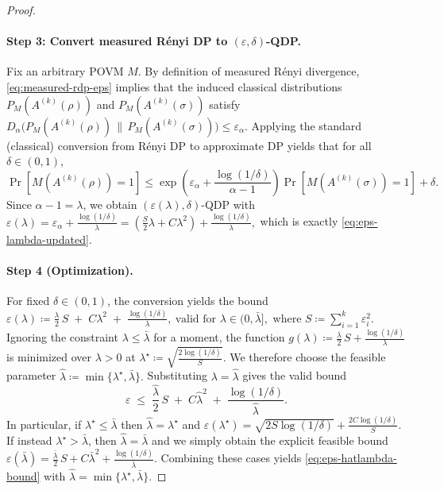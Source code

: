 \documentclass[11pt]{article}
\theoremstyle{plain}
\theoremstyle{remark}
\begin{document}
\begin{proof}
\paragraph{Step 3: Convert measured R\'enyi DP to $(\varepsilon,\delta)$-QDP.}
Fix an arbitrary POVM $M$. By definition of measured R\'enyi divergence,
\eqref{eq:measured-rdp-eps} implies that the induced classical distributions
$P_M(A^{(k)}(\rho))$ and $P_M(A^{(k)}(\sigma))$ satisfy
$
D_{\alpha}\!\big(P_M(A^{(k)}(\rho))\,\|\,P_M(A^{(k)}(\sigma))\big)
\le
\varepsilon_\alpha.
$
Applying the standard (classical) conversion from R\'enyi DP to approximate DP yields that for all
$\delta\in(0,1)$,
\[
\Pr[M(A^{(k)}(\rho))=1]
\le
\exp\!\left(\varepsilon_\alpha+\frac{\log(1/\delta)}{\alpha-1}\right)
\Pr[M(A^{(k)}(\sigma))=1]+\delta.
\]
Since $\alpha-1=\lambda$, we obtain $(\varepsilon(\lambda),\delta)$-QDP with
$
\varepsilon(\lambda)
=
\varepsilon_\alpha + \frac{\log(1/\delta)}{\lambda}
=
\left(\frac{S}{2}\lambda + C\lambda^2\right) + \frac{\log(1/\delta)}{\lambda},
$
which is exactly \eqref{eq:eps-lambda-updated}.


\paragraph{Step 4 (Optimization).}
For fixed $\delta\in(0,1)$, the conversion 
yields the bound
$
\varepsilon(\lambda)
\coloneqq \frac{\lambda}{2}\,S \;+\; C\lambda^2 \;+\; \frac{\log(1/\delta)}{\lambda},
\ \text{valid for } \lambda\in(0,\bar\lambda],
$
where $S\coloneqq\sum_{i=1}^k \varepsilon_i^2$.
Ignoring the constraint $\lambda\le \bar\lambda$ for a moment, the function
$
g(\lambda)\coloneqq\frac{\lambda}{2}\,S+\frac{\log(1/\delta)}{\lambda}
$
is minimized over $\lambda>0$ at
$
\lambda^\star \coloneqq \sqrt{\frac{2\log(1/\delta)}{S}}.
$
We therefore choose the feasible parameter
$
\hat\lambda \coloneqq \min\{\lambda^\star,\bar\lambda\}.
$
Substituting $\lambda=\hat\lambda$ gives the valid bound
\begin{equation}
\label{eq:eps-hatlambda-bound}
\varepsilon
\;\le\;
\frac{\hat\lambda}{2}\,S \;+\; C\hat\lambda^2 \;+\; \frac{\log(1/\delta)}{\hat\lambda}.
\end{equation}
In particular, if $\lambda^\star\le \bar\lambda$ then $\hat\lambda=\lambda^\star$ and
$
\varepsilon(\lambda^\star)
=
\sqrt{2S\log(1/\delta)}+\frac{2C\log(1/\delta)}{S}.
$
If instead $\lambda^\star>\bar\lambda$, then $\hat\lambda=\bar\lambda$ and we simply obtain the explicit feasible bound \\ 
$
\varepsilon(\bar\lambda)
=
\frac{\bar\lambda}{2}\,S + C\bar\lambda^2 + \frac{\log(1/\delta)}{\bar\lambda}.$
Combining these cases yields \eqref{eq:eps-hatlambda-bound} with
$\hat\lambda=\min\{\lambda^\star,\bar\lambda\}$.

\end{proof}
\end{document}
